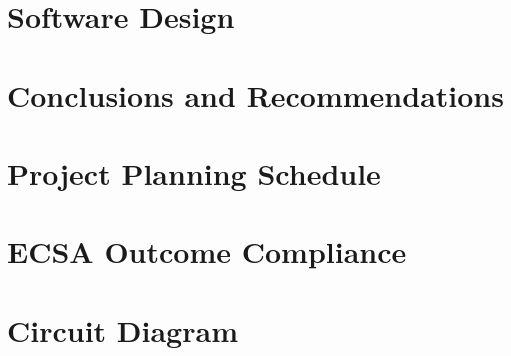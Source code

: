 \documentclass[12pt,a4paper]{report}
\begin{document}
\chapter{Software Design}

\chapter{Conclusions and Recommendations}





\appendix
\chapter{Project Planning Schedule}

\chapter{ECSA Outcome Compliance}

\chapter{Circuit Diagram}
\newpage
\end{document}
